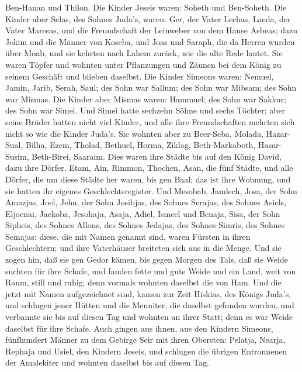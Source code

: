 Ben-Hanan und Thilon. Die Kinder Jeseis waren: Soheth und Ben-Soheth.
 Die Kinder aber Selas, des Sohnes Juda's, waren: Ger, der
Vater Lechas, Laeda, der Vater Maresas, und die Freundschaft der
Leinweber von dem Hause Asbeas;  dazu Jokim und die Männer
von Koseba, und Joas und Saraph, die da Herren wurden über Moab, und sie
kehrten nach Lahem zurück, wie die alte Rede lautet.  Sie
waren Töpfer und wohnten unter Pflanzungen und Zäunen bei dem König zu
seinem Geschäft und blieben daselbst.  Die Kinder Simeons
waren: Nemuel, Jamin, Jarib, Serah, Saul;  des Sohn war
Sallum; des Sohn war Mibsam; des Sohn war Mismas.  Die
Kinder aber Mismas waren: Hammuel; des Sohn war Sakkur; des Sohn war
Simei.  Und Simei hatte sechzehn Söhne und sechs Töchter;
aber seine Brüder hatten nicht viel Kinder, und alle ihre Freundschaften
mehrten sich nicht so wie die Kinder Juda's.  Sie wohnten
aber zu Beer-Seba, Molada, Hazar-Sual,  Bilha, Ezem,
Tholad,  Bethuel, Horma, Ziklag, 
Beth-Markaboth, Hasar-Susim, Beth-Birei, Saaraim. Dies waren ihre Städte
bis auf den König David, dazu ihre Dörfer.  Etam, Ain,
Rimmon, Thochen, Asan, die fünf Städte,  und alle Dörfer,
die um diese Städte her waren, bis gen Baal; das ist ihre Wohnung, und
sie hatten ihr eigenes Geschlechtsregister.  Und Mesobab,
Jamlech, Josa, der Sohn Amazjas,  Joel, Jehu, der Sohn
Josibjas, des Sohnes Serajas, des Sohnes Asiels,  Eljoenai,
Jaekoba, Jesohaja, Asaja, Adiel, Ismeel und Benaja,  Sisa,
der Sohn Sipheis, des Sohnes Allons, des Sohnes Jedajas, des Sohnes
Simris, des Sohnes Semajas:  diese, die mit Namen genannt
sind, waren Fürsten in ihren Geschlechtern; und ihre Vaterhäuser
breiteten sich aus in die Menge.  Und sie zogen hin, daß
sie gen Gedor kämen, bis gegen Morgen des Tals, daß sie Weide suchten
für ihre Schafe,  und fanden fette und gute Weide und ein
Land, weit von Raum, still und ruhig; denn vormals wohnten daselbst die
von Ham.  Und die jetzt mit Namen aufgezeichnet sind, kamen
zur Zeit Hiskias, des Königs Juda's, und schlugen jener Hütten und die
Meuniter, die daselbst gefunden wurden, und verbannte sie bis auf diesen
Tag und wohnten an ihrer Statt; denn es war Weide daselbst für ihre
Schafe.  Auch gingen aus ihnen, aus den Kindern Simeons,
fünfhundert Männer zu dem Gebirge Seir mit ihren Obersten: Pelatja,
Nearja, Rephaja und Usiel, den Kindern Jeseis,  und
schlugen die übrigen Entronnenen der Amalekiter und wohnten daselbst bis
auf diesen Tag.

